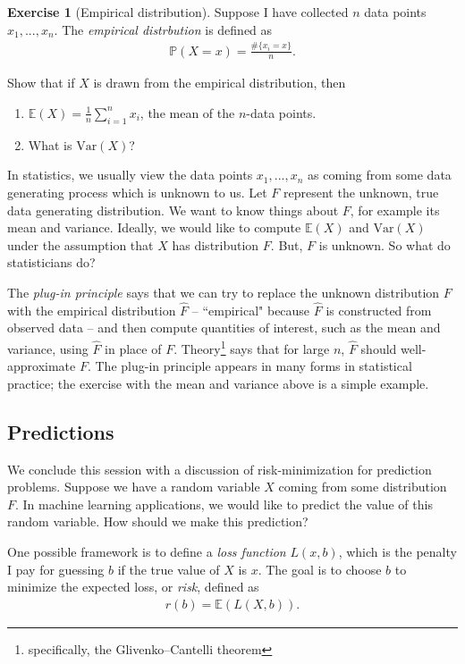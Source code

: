 \documentclass[11pt]{article}
\theoremstyle{definition}
\newtheorem{exercise}[]{Exercise}
\renewcommand{\P}{\mathbb{P}}
\newcommand{\E}{\mathbb{E}}
\newcommand{\V}{\text{Var}}
\begin{document}
\begin{exercise}[Empirical distribution]
Suppose I have collected $n$ data points $x_1, ..., x_n$.
The \textit{empirical distrbution}
is defined as
\begin{align*}
  \P(X = x) = \frac{\#\{x_i = x\}}{n}.
\end{align*}

Show that if $X$ is drawn from the empirical distribution, then
\begin{enumerate}[label = (\alph*)]
  \item $\E(X) = \frac{1}{n}\sum_{i=1}^n x_i$, the mean of the $n$-data points.
  \item What is $\V(X)$?
\end{enumerate}
\label{exer:empirical}
\end{exercise}

In statistics, we usually view the data points $x_1, ..., x_n$ as coming from some
data generating process which is unknown to us. Let $F$ represent the unknown, true
data generating distribution. We want to know things about $F$, for example its mean
and variance. Ideally, we would like to compute $\E(X)$ and $\V(X)$ under the assumption
that $X$ has distribution $F$. But, $F$ is unknown. So what do statisticians do?

The \textit{plug-in principle} says that we can try to replace the unknown
distribution $F$ with the empirical distribution $\hat F$ -- ``empirical" because
$\hat F$ is constructed from observed data -- and then compute quantities of interest,
such as the mean and variance,
using $\hat F$ in place of $F$.
Theory\footnote{specifically, the Glivenko–Cantelli theorem}
says that for large $n$, $\hat F$ should well-approximate $F$.
The plug-in principle
appears in many forms in statistical practice; the exercise with the mean and variance above
is a simple example.

\subsection{Predictions}

We conclude this session with a discussion of risk-minimization for prediction problems.
Suppose we have a random variable $X$ coming from some distribution $F$.
In machine learning applications, we would like to predict the value of this random variable.
How should we make this prediction?

One possible framework is to define a \textit{loss function} $L(x, b)$, which is
the penalty I pay for guessing $b$ if the true value of $X$ is $x$.
The goal is to choose $b$ to minimize the expected loss, or \textit{risk}, defined as
\begin{align}
  r(b) = \E(L(X, b)).
  \label{eq:risk}
\end{align}
\end{document}
